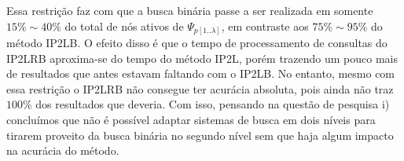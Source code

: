 Essa restrição faz com que a busca binária passe a ser realizada em somente $15\% \sim 40\%$ do total de nós ativos de $\Psi_{p[1..\lambda]}$, em contraste aos $75\% \sim 95\%$ do método IP2LB. O efeito disso é que o tempo de processamento de consultas do IP2LRB aproxima-se do tempo do método IP2L, porém trazendo um pouco mais de resultados que antes estavam faltando com o IP2LB. No entanto, mesmo com essa restrição o IP2LRB não consegue ter acurácia absoluta, pois ainda não traz $100\%$ dos resultados que deveria. Com isso, pensando na questão de pesquisa i) concluímos que não é possível adaptar sistemas de busca em dois níveis para tirarem proveito da busca binária no segundo nível sem que haja algum impacto na acurácia do método.